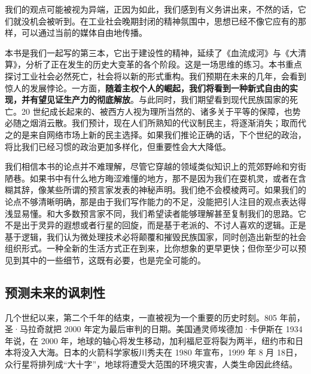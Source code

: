 我们的观点可能被视为异端，正因为如此，我们感到有义务讲出来，不然的话，它们就没机会被听到。在工业社会晚期封闭的精神氛围中，思想已经不像它应有的那样，可以通过当前的媒体自由地传播。


本书是我们一起写的第三本，它出于建设性的精神，延续了《血流成河》与《大清算》，分析了正在发生的历史大变革的各个阶段。这是一场思维的练习。本书重点探讨工业社会必然死亡，社会将以新的形式重构。我们预期在未来的几年，会看到惊人的发展悖论。一方面，\textbf{随着主权个人的崛起，我们将看到一种新式自由的实现，并有望见证生产力的彻底解放}。与此同时，我们期望看到现代民族国家的死亡。20 世纪成长起来的、被西方人视为理所当然的、诸多关于平等的保障，也势必随之烟消云散。我们预计，现在人们所熟知的代议制民主，将逐渐消失；取而代之的是来自网络市场上新的民主选择。如果我们推论正确的话，下个世纪的政治，将比我们已经习惯的政治更加多样化，但重要性会大大降低。


我们相信本书的论点并不难理解，尽管它穿越的领域类似知识上的荒郊野岭和穷街陋巷。如果书中有什么地方晦涩难懂的地方，那不是因为我们在耍机灵，或者在含糊其辞，像某些所谓的预言家发表的神秘声明。我们绝不会模棱两可。如果我们的论点不够清晰明确，那是由于我们写作能力的不足，没能把引人注目的观点表达得浅显易懂。和大多数预言家不同，我们希望读者能够理解甚至复制我们的思路。它不是出于灵异的遐想或者行星的回旋，而是基于老派的、不讨人喜欢的逻辑。正是基于逻辑，我们认为微处理技术必将颠覆和摧毁民族国家，同时创造出新型的社会组织形式。一种全新的生活方式正在到来，比你想象的更早更快；但你至少可以预见到其中的一些细节，这既有必要，也是完全可能的。


\subsection{预测未来的讽刺性}
几个世纪以来，第二个千年的结束，一直被视为一个重要的历史时刻。805 年前，圣·马拉奇就把 2000 年定为最后审判的日期。美国通灵师埃德加·卡伊斯在 1934年说，在 2000 年，地球的轴心将发生移动，加利福尼亚将裂为两半，纽约市和日本将没入大海。日本的火箭科学家板川秀夫在 1980 年宣布，1999 年 8 月 18日，众行星将排列成“大十字”，地球将遭受大范围的环境灾害，人类生命因此终结。


